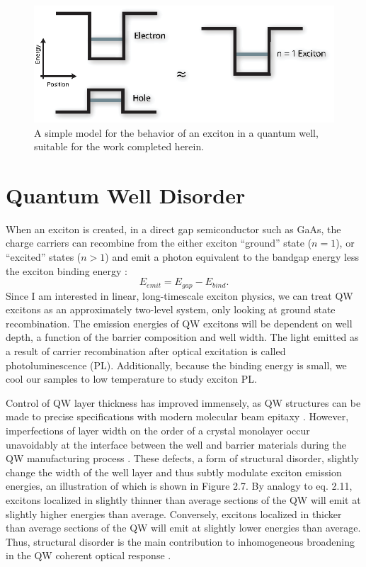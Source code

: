 \begin{figure}[h!]
\label{Spapprox}
\centering
\includegraphics[width = .9\textwidth]{SpApprox.eps}
\caption{\doublespacing A simple model for the behavior of an exciton in a quantum well, suitable for the work completed herein.}
\label{potentials}
\end{figure}


\newpage \section{Quantum Well Disorder}
\indent When an exciton is created, in a direct gap semiconductor such as GaAs, the charge carriers can recombine from the either exciton ``ground'' state ($n=1$), or ``excited''  states ($n>1$) and emit a photon equivalent to the bandgap energy less the exciton binding energy \cite{gilleo}:
\begin{equation}
 E_{emit} = E_{gap}-E_{bind}.
\end{equation}
Since I am interested in linear, long-timescale exciton physics, we can treat QW excitons as an approximately two-level system, only looking at ground state recombination. The emission energies of QW excitons will be dependent on well depth, a function of the barrier composition and well width. The light emitted as a result of carrier recombination after optical excitation is called photoluminescence (PL). Additionally, because the binding energy is small, we cool our samples to low temperature to study exciton PL.

\indent Control of QW layer thickness has improved immensely, as QW structures can be made to precise specifications with modern molecular beam epitaxy \cite{davies}. However, imperfections of layer width on the order of a crystal monolayer occur unavoidably at the interface between the well and barrier materials during the QW manufacturing process \cite{yoshitaterrace,weis, glinka}. These defects, a form of structural disorder, slightly change the width of the well layer and thus subtly modulate exciton emission energies, an illustration of which is shown in Figure 2.7. By analogy to eq. 2.11, excitons localized in slightly thinner than average sections of the QW will emit at slightly higher energies than average. Conversely, excitons localized in thicker than average sections of the QW will emit at slightly lower energies than average. Thus, structural disorder is the main contribution to inhomogeneous broadening in the QW coherent optical response \cite{bristowsep}. 

